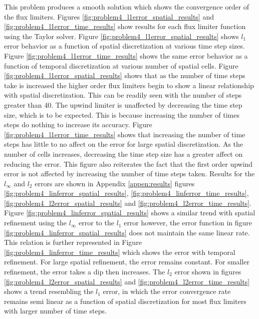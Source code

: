\noindent This problem produces a smooth solution which shows the convergence order of the flux limiters. Figures \ref{fig:problem4_l1error_spatial_results} and \ref{fig:problem4_l1error_time_results} show results for each flux limiter function using the Taylor solver. Figure \ref{fig:problem4_l1error_spatial_results} shows $l_{1}$ error behavior as a function of spatial discretization at various time step sizes. Figure \ref{fig:problem4_l1error_time_results} shows the same error behavior as a function of temporal discretization at various number of spatial cells. Figure \ref{fig:problem4_l1error_spatial_results} shows that as the number of time steps take is increased the higher order flux limiters begin to show a linear relationship with spatial discretization. This can be readily seen with the number of steps greater than 40. The upwind limiter is unaffected by decreasing the time step size, which is to be expected. This is because increasing the number of times steps do nothing to increase its accuracy. Figure \ref{fig:problem4_l1error_time_results} shows that increasing the number of time steps has little to no affect on the error for large spatial discretization. As the number of cells increases, decreasing the time step size has a greater affect on reducing the error. This figure also reiterates the fact that the first order upwind error is not affected by increasing the number of time steps taken. Results for the $l_{\infty}$ and $l_{2}$ errors are shown in Appendix \ref{appen:results} figures \ref{fig:problem4_linferror_spatial_results}, \ref{fig:problem4_linferror_time_results}, \ref{fig:problem4_l2error_spatial_results} and \ref{fig:problem4_l2error_time_results}. Figure \ref{fig:problem4_linferror_spatial_results} shows a similar trend with spatial refinement using the $l_{\infty}$ error to the $l_{1}$ error however, the error function in figure \ref{fig:problem4_linferror_spatial_results} does not maintain the same linear rate. This relation is further represented in Figure \ref{fig:problem4_linferror_time_results} which shows the error with temporal refinement. For large spatial refinement, the error remains constant. For smaller refinement, the error takes a dip then increases. The $l_{2}$ error shown in figures \ref{fig:problem4_l2error_spatial_results} and \ref{fig:problem4_l2error_time_results} shows a trend resembling the $l_{1}$ error, in which the error convergence rate remains semi linear as a function of spatial discretization for most flux limiters with larger number of time steps. 

